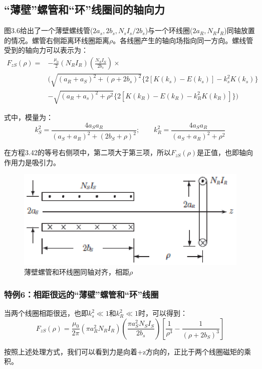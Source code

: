 \subsection{“薄壁”螺管和“环”线圈间的轴向力}
图3.6给出了一个薄壁螺线管($2a_s,2b_s,N_s I_s/2b_s$)与一个环线圈($2a_R,N_R I_R$)同轴放置的情况。螺管右侧距离环线圈距离$\rho$。各线圈产生的轴向场指向同一方向。螺线管受到的轴向力可以表示为：
\begin{equation}
\begin{split}
F_{zS}(\rho)=&-\frac{\mu_0}{2}(N_R I_R)(\frac{N_S I_S}{2b_s})\times\\
&\big(\sqrt{(a_R+a_S)^2+(\rho+2b_s)^2}\{2[K(k_s)-E(k_s)]-k_s^2K(k_s)\}\\
&-\sqrt{(a_R+a_s)^2+\rho^2}\{2[K(k_R)-E(k_R)-k_R^2K(k_R)]\}\big)
\end{split}
\end{equation}

式中，模量为：
$$k_{S}^2=\frac{4a_S a_R}{(a_S+a_R)^2+(2b_S+\rho)^2} ;\qquad k_{R}^2=\frac{4a_S a_R}{(a_S+a_R)^2+\rho^2} $$

在方程3.42的等号右侧项中，第二项大于第三项，所以$F_{zS}(\rho)$是正值，也即轴向作用力是吸引力。
\begin{figure}[htbp]
	\centering
	\includegraphics[scale=0.9]{chpt3/figs/fig3.6.eps}
	\caption{薄壁螺管和环线圈同轴对齐，相距$\rho$}
\end{figure}

\subsubsection{特例6：相距很远的“薄壁”螺管和“环”线圈}
当两个线圈相距很远，也即$k_s^2\ll 1$和$k_R^2\ll 1$时，可以得到：
\begin{equation}
F_{zS}(\rho)=\frac{\mu_0}{2\pi}(\pi a_R^2N_R I_R)(\frac{\pi a_S^2 N_S I_S}{2 b_s})\left[\frac{1}{\rho^3}-\frac{1}{(\rho+2b_S)^3}\right]
\end{equation}

按照上述处理方式，我们可以看到力是向着+z方向的，正比于两个线圈磁矩的乘积。

